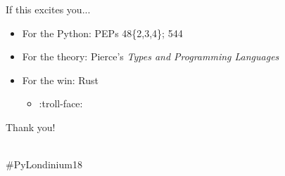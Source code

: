 \documentclass[10pt]{beamer}
\begin{document}
\begin{frame}{If this excites you...}
    \begin{itemize}[<+->]
        \item For the Python: PEPs 48\{2,3,4\}; 544
        \item For the theory: Pierce's \textit{Types and Programming Languages}
        \item For the win: Rust
        \begin{itemize}
            \item :troll-face:
        \end{itemize}
    \end{itemize}
\end{frame}

\begin{frame}[standout]
    Thank you!

    \bigskip\normalsize
    \faGithub\;\faTwitter\;\makeatletter@OJFord\\\#PyLondinium18
\end{frame}
\end{document}
